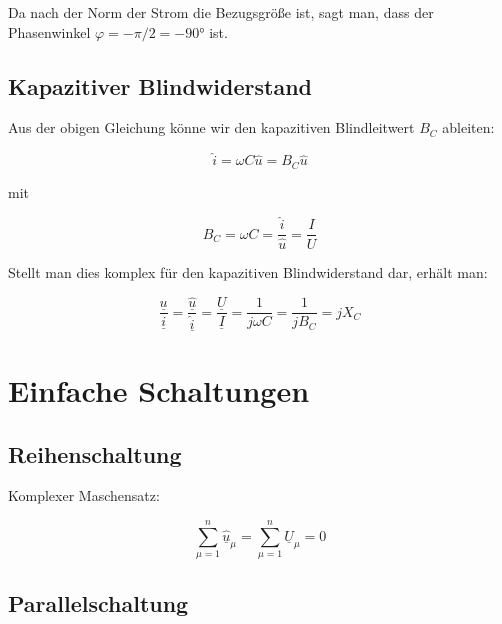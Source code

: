 \documentclass[
  ngerman,
  letterpaper,
]{scrbook}
\begin{document}
\begin{tcolorbox}[enhanced jigsaw, titlerule=0mm, rightrule=.15mm, toprule=.15mm, colback=white, toptitle=1mm, bottomrule=.15mm, coltitle=black, leftrule=.75mm, arc=.35mm, colbacktitle=quarto-callout-note-color!10!white, opacityback=0, bottomtitle=1mm, colframe=quarto-callout-note-color-frame, opacitybacktitle=0.6, breakable, title=\textcolor{quarto-callout-note-color}{\faInfo}\hspace{0.5em}{Hinweis}, left=2mm]

Da nach der Norm der Strom die Bezugsgröße ist, sagt man, dass der
Phasenwinkel \(\varphi = - \pi/2 = -90°\) ist.

\end{tcolorbox}

\subsection{Kapazitiver
Blindwiderstand}\label{kapazitiver-blindwiderstand}

Aus der obigen Gleichung könne wir den kapazitiven Blindleitwert \(B_C\)
ableiten:

\[\hat{i} = \omega C \hat{u} = B_C \hat{u}\]

mit

\[B_C = \omega C = \frac{\hat{i}}{\hat{u}} = \frac{I}{U}\]

Stellt man dies komplex für den kapazitiven Blindwiderstand dar, erhält
man:

\[\frac{\underline{u}}{\underline{i}} = \frac{\underline{\hat{u}}}{\underline{\hat{i}}} = \frac{\underline{U}}{\underline{I}} = \frac{1}{j \omega C} = \frac{1}{j B_C} = j X_C\]

\section{Einfache Schaltungen}\label{einfache-schaltungen}

\subsection{Reihenschaltung}\label{reihenschaltung}

Komplexer Maschensatz:

\[\sum_{\mu = 1}^n \underline{\hat{u}}_\mu = \sum_{\mu = 1}^n \underline{U}_\mu = 0\]

\subsection{Parallelschaltung}\label{parallelschaltung}
\end{document}
